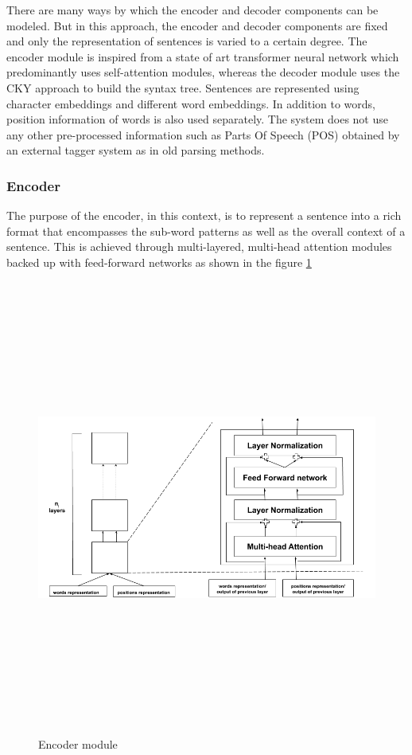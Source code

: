 \documentclass[a4paper, 11pt]{article}
\begin{document}
There are many ways by which the encoder and decoder components can be modeled. But in this approach, the encoder and decoder components are fixed and only the representation of sentences is varied to a certain degree. The encoder module is inspired from a state of art transformer neural network which predominantly uses self-attention modules, whereas the decoder module uses the CKY approach to build the syntax tree. Sentences are represented using character embeddings and different word embeddings. In addition to words, position information of words is also used separately. The system does not use any other pre-processed information such as Parts Of Speech (POS) obtained by an external tagger system as in old parsing methods.

\subsubsection{Encoder}

The purpose of the encoder, in this context, is to represent a sentence into a rich format that encompasses the sub-word patterns as well as the overall context of a sentence. This is achieved through multi-layered, multi-head attention modules backed up with feed-forward networks as shown in the figure \ref{fig:encoder_module}

\begin{figure}[htpb]
    \centering
    \includegraphics[width=\textwidth,height=15cm,keepaspectratio=true]
    {encoder.png}
    \caption{
        Encoder module
    }
    \label{fig:encoder_module}
\end{figure}
\end{document}
